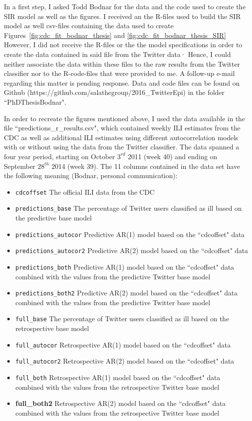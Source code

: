 \documentclass[11pt, a4paper,twoside]{report}\usepackage[]{graphicx}\usepackage[]{color}
\begin{document}
In a first step, I asked Todd Bodnar for the data and the code used to create the SIR model as well as the figures. I received an the R-files used to build the SIR model as well csv-files containing the data used to create Figures~\ref{fig:cdc_fit_bodnar_thesis} and \ref{fig:cdc_fit_bodnar_thesis_SIR}  However, I did not receive the R-files or the the model specifications in order to create the data contained in said file from the Twitter data· Hence, I could neither associate the data within these files to the raw results from the Twitter classifier nor to the R-code-files that were provided to me. A follow-up e-mail regarding this matter is pending response. Data and code files can be found on Github (https://github.com/salathegroup/2016\_TwitterEpi) in the folder ``PhDThesisBodnar".

In order to recreate the figures mentioned above, I used the data available in the file ``predictions\_r\_results.csv", which contained weekly ILI estimates from the CDC as well as additional ILI estimates using different autocorrelation models with or without using the data from the Twitter classifier. The data spanned a four year period, starting on October $3^{rd}$ 2011 (week 40) and ending on September $28^{th}$ 2014 (week 39). The 11 columns contained in the data set have the following meaning (Bodnar, personal communication):

\begin{itemize}
  \item \texttt{cdcoffset} The official ILI data from the CDC
  \item \texttt{predictions\_base} The percentage of Twitter users classified as ill based on the predictive base model
  \item \texttt{predictions\_autocor} Predictive AR(1) model based on the ``cdcoffset" data
  \item \texttt{predictions\_autocor2} Predictive AR(2) model based on the ``cdcoffset" data
  \item \texttt{predictions\_both} Predictive AR(1) model based on the ``cdcoffset" data combined with the values from the predictive Twitter base model
  \item \texttt{predictions\_both2} Predictive AR(2) model based on the ``cdcoffset" data combined with the values from the predictive Twitter base model
 \item \texttt{full\_base} The percentage of Twitter users classified as ill based on the retrospective base model
  \item \texttt{full\_autocor} Retrospective AR(1) model based on the ``cdcoffset" data
  \item \texttt{full\_autocor2} Retrospective AR(2) model based on the ``cdcoffset" data
  \item \texttt{full\_both} Retrospective AR(1) model based on the ``cdcoffset" data combined with the values from the retrospective Twitter base model
  \item \textbf{full\_both2} Retrospective AR(2) model based on the ``cdcoffset" data combined with the values from the retrospective Twitter base model
\end{itemize}
\end{document}
